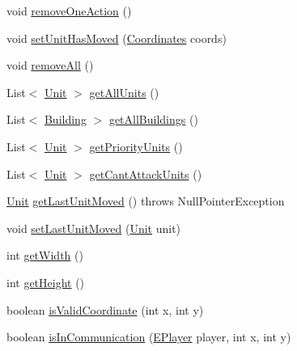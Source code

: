 \begin{DoxyCompactItemize}
void \mbox{\hyperlink{classgame_1_1game_state_1_1_game_state_af28ff27a89c8b57b67919e5cf17982c5}{remove\+One\+Action}} ()
\item 
void \mbox{\hyperlink{classgame_1_1game_state_1_1_game_state_adbe937aae18d5146f28e3cd181c54515}{set\+Unit\+Has\+Moved}} (\mbox{\hyperlink{classrule_engine_1_1_coordinates}{Coordinates}} coords)
\item 
void \mbox{\hyperlink{classgame_1_1game_state_1_1_game_state_ac216deada73327e534501b741a7ffa54}{remove\+All}} ()
\item 
List$<$ \mbox{\hyperlink{classgame_1_1board_1_1_unit}{Unit}} $>$ \mbox{\hyperlink{classgame_1_1game_state_1_1_game_state_a07fb5a48de7241b6cb683989bf0a3f9b}{get\+All\+Units}} ()
\item 
List$<$ \mbox{\hyperlink{classgame_1_1board_1_1_building}{Building}} $>$ \mbox{\hyperlink{classgame_1_1game_state_1_1_game_state_a9f60d276ddcdaaca453b1767aa03608a}{get\+All\+Buildings}} ()
\item 
List$<$ \mbox{\hyperlink{classgame_1_1board_1_1_unit}{Unit}} $>$ \mbox{\hyperlink{classgame_1_1game_state_1_1_game_state_a825ff360e839e7d4976539b460846b25}{get\+Priority\+Units}} ()
\item 
List$<$ \mbox{\hyperlink{classgame_1_1board_1_1_unit}{Unit}} $>$ \mbox{\hyperlink{classgame_1_1game_state_1_1_game_state_a79fab4d746df83e6391ecb9db1c3ff09}{get\+Cant\+Attack\+Units}} ()
\item 
\mbox{\hyperlink{classgame_1_1board_1_1_unit}{Unit}} \mbox{\hyperlink{classgame_1_1game_state_1_1_game_state_ac74c805b98b13a313b0a337e5fbd41d2}{get\+Last\+Unit\+Moved}} ()  throws Null\+Pointer\+Exception 
\item 
void \mbox{\hyperlink{classgame_1_1game_state_1_1_game_state_a6b65e481b29441ea54040f36144b1d8b}{set\+Last\+Unit\+Moved}} (\mbox{\hyperlink{classgame_1_1board_1_1_unit}{Unit}} unit)
\item 
int \mbox{\hyperlink{classgame_1_1game_state_1_1_game_state_ab7f97a46f9310d08bd3358755168262c}{get\+Width}} ()
\item 
int \mbox{\hyperlink{classgame_1_1game_state_1_1_game_state_a47a2783808cfff8d970c253a1f8a4a94}{get\+Height}} ()
\item 
boolean \mbox{\hyperlink{classgame_1_1game_state_1_1_game_state_aa60313a4c02762b0b05c5474cb3a987f}{is\+Valid\+Coordinate}} (int x, int y)
\item 
boolean \mbox{\hyperlink{classgame_1_1game_state_1_1_game_state_a8e23f889d162d3d43d9d8d24d3525bbd}{is\+In\+Communication}} (\mbox{\hyperlink{enumgame_1_1_e_player}{E\+Player}} player, int x, int y)

\end{DoxyCompactItemize}
